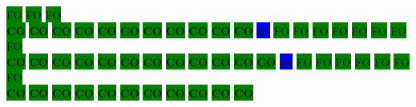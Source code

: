 \colorbox{green}{\color[gray]{0.75}FO}%
\colorbox{green}{\color[gray]{0.75}FO}%
\colorbox{green}{\color[gray]{0.75}FO}%
\\
\colorbox{green}{\color[rgb]{0,0,0}\textbf{CO}}%
\colorbox{green}{\color[rgb]{0,0,0}\textbf{CO}}%
\colorbox{green}{\color[rgb]{0,0,0}\textbf{CO}}%
\colorbox{green}{\color[rgb]{0,0,0}\textbf{CO}}%
\colorbox{green}{\color[rgb]{0,0,0}\textbf{CO}}%
\colorbox{green}{\color[rgb]{0,0,0}\textbf{CO}}%
\colorbox{green}{\color[rgb]{0,0,0}\textbf{CO}}%
\colorbox{green}{\color[rgb]{0,0,0}\textbf{CO}}%
\colorbox{green}{\color[rgb]{0,0,0}\textbf{CO}}%
\colorbox{green}{\color[rgb]{0,0,0}\textbf{CO}}%
\colorbox{green}{\color[rgb]{0,0,0}\textbf{CO}}%
\colorbox{blue}{\color[rgb]{1,0,0}\textbf{04}}%
\colorbox{green}{\color[gray]{0.75}FO}%
\colorbox{green}{\color[gray]{0.75}FO}%
\colorbox{green}{\color[gray]{0.75}FO}%
\colorbox{green}{\color[gray]{0.75}FO}%
\colorbox{green}{\color[gray]{0.75}FO}%
\colorbox{green}{\color[gray]{0.75}FO}%
\colorbox{green}{\color[gray]{0.75}FO}%
\colorbox{green}{\color[gray]{0.75}FO}%
\\
\colorbox{green}{\color[rgb]{0,0,0}\textbf{CO}}%
\colorbox{green}{\color[rgb]{0,0,0}\textbf{CO}}%
\colorbox{green}{\color[rgb]{0,0,0}\textbf{CO}}%
\colorbox{green}{\color[rgb]{0,0,0}\textbf{CO}}%
\colorbox{green}{\color[rgb]{0,0,0}\textbf{CO}}%
\colorbox{green}{\color[rgb]{0,0,0}\textbf{CO}}%
\colorbox{green}{\color[rgb]{0,0,0}\textbf{CO}}%
\colorbox{green}{\color[rgb]{0,0,0}\textbf{CO}}%
\colorbox{green}{\color[rgb]{0,0,0}\textbf{CO}}%
\colorbox{green}{\color[rgb]{0,0,0}\textbf{CO}}%
\colorbox{green}{\color[rgb]{0,0,0}\textbf{CO}}%
\colorbox{green}{\color[rgb]{0,0,0}\textbf{CO}}%
\colorbox{blue}{\color[rgb]{1,0,0}\textbf{06}}%
\colorbox{green}{\color[gray]{0.75}FO}%
\colorbox{green}{\color[gray]{0.75}FO}%
\colorbox{green}{\color[gray]{0.75}FO}%
\colorbox{green}{\color[gray]{0.75}FO}%
\colorbox{green}{\color[gray]{0.75}FO}%
\colorbox{green}{\color[gray]{0.75}FO}%
\colorbox{green}{\color[gray]{0.75}FO}%
\\
\colorbox{green}{\color[rgb]{0,0,0}\textbf{CO}}%
\colorbox{green}{\color[rgb]{0,0,0}\textbf{CO}}%
\colorbox{green}{\color[rgb]{0,0,0}\textbf{CO}}%
\colorbox{green}{\color[rgb]{0,0,0}\textbf{CO}}%
\colorbox{green}{\color[rgb]{0,0,0}\textbf{CO}}%
\colorbox{green}{\color[rgb]{0,0,0}\textbf{CO}}%
\colorbox{green}{\color[rgb]{0,0,0}\textbf{CO}}%
\colorbox{green}{\color[rgb]{0,0,0}\textbf{CO}}%
\colorbox{green}{\color[rgb]{0,0,0}\textbf{CO}}%
\colorbox{green}{\color[rgb]{0,0,0}\textbf{CO}}%
\colorbox{green}{\color[rgb]{0,0,0}\textbf{CO}}%
